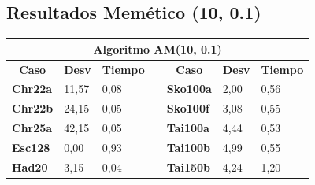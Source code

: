\documentclass[a4paper, 12pt]{article}
\begin{document}
      
      
      \newpage
      \subsection{Resultados Memético (10, 0.1)}
      \begin{table}[H]
\centering
\label{my-label}
\begin{tabular}{|l|l|l|l|l|l|l|}
\hline
\multicolumn{7}{|c|}{\textbf{Algoritmo AM(10, 0.1)}}                                                                                                                                                                                                              \\ \hline
\multicolumn{1}{|c|}{\textbf{Caso}} & \multicolumn{1}{c|}{\textbf{Desv}} & \multicolumn{1}{c|}{\textbf{Tiempo}} & \multicolumn{1}{c|}{\textbf{}} & \multicolumn{1}{c|}{\textbf{Caso}} & \multicolumn{1}{c|}{\textbf{Desv}} & \multicolumn{1}{c|}{\textbf{Tiempo}} \\ \cline{1-3} \cline{5-7} 
\textbf{Chr22a}                     & 11,57                              & 0,08                                 &                                & \textbf{Sko100a}                   & 2,00                               & 0,56                                 \\ \cline{1-3} \cline{5-7} 
\textbf{Chr22b}                     & 24,15                              & 0,05                                 &                                & \textbf{Sko100f}                   & 3,08                               & 0,55                                 \\ \cline{1-3} \cline{5-7} 
\textbf{Chr25a}                     & 42,15                              & 0,05                                 &                                & \textbf{Tai100a}                   & 4,44                               & 0,53                                 \\ \cline{1-3} \cline{5-7} 
\textbf{Esc128}                     & 0,00                               & 0,93                                 &                                & \textbf{Tai100b}                   & 4,99                               & 0,55                                 \\ \cline{1-3} \cline{5-7} 
\textbf{Had20}                      & 3,15                               & 0,04                                 &                                & \textbf{Tai150b}                   & 4,24                               & 1,20                                 \\ \cline{1-3} \cline{5-7} 

\end{tabular}
\end{table}
\end{document}
